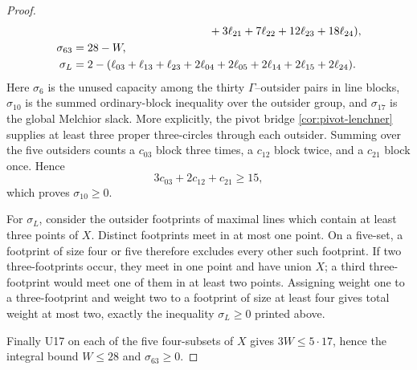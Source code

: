 \begin{proof}
\begin{align}
&\hspace{38mm}
 +3\ell_{21}+7\ell_{22}+12\ell_{23}+18\ell_{24}),\label{eq:n11-g6-slacks}\\
\sigma_{63}={}&28-W,\notag\\
\sigma_L={}&2-(\ell_{03}+\ell_{13}+\ell_{23}
 +2\ell_{04}+2\ell_{05}+2\ell_{14}+2\ell_{15}+2\ell_{24}).\notag
\end{align}
Here $\sigma_6$ is the unused capacity among the thirty
$\Gamma$--outsider pairs in line blocks, $\sigma_{10}$ is the summed
ordinary-block inequality over the outsider group, and $\sigma_{17}$ is
 the global Melchior slack.  More explicitly, the pivot bridge
 \cref{cor:pivot-lenchner} supplies at least three proper three-circles
 through each outsider.
Summing over the five outsiders counts a $c_{03}$ block three times, a
$c_{12}$ block twice, and a $c_{21}$ block once.  Hence
\[
 3c_{03}+2c_{12}+c_{21}\ge15,
\]
which proves $\sigma_{10}\ge0$.

For $\sigma_L$, consider the outsider footprints of maximal lines which
contain at least three points of $X$.  Distinct footprints meet in at most
one point.  On a five-set, a footprint of size four or five therefore
excludes every other such footprint.  If two three-footprints occur, they
meet in one point and have union $X$; a third three-footprint would meet one
of them in at least two points.  Assigning weight one to a three-footprint
and weight two to a footprint of size at least four gives total weight at
most two, exactly the inequality $\sigma_L\ge0$ printed above.

Finally U17 on each of the five four-subsets of $X$ gives
$3W\le5\cdot17$, hence the integral bound $W\le28$ and
$\sigma_{63}\ge0$.


\end{proof}
